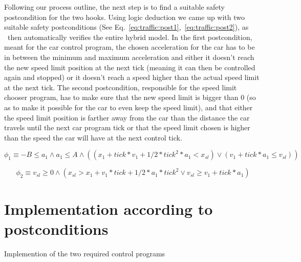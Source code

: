 Following our process outline, the next step is to find a suitable safety postcondition for the two hooks. Using logic deduction we came up with two suitable safety postconditions (See Eq.~\ref{eq:traffic:post1},~\ref{eq:traffic:post2}), as \keym~then automatically verifies the entire hybrid model. In the first postcondition, meant for the car control program, the chosen acceleration for the car has to be in between the minimum and maximum acceleration and either it doesn't reach the new speed limit position at the next tick (meaning it can then be controlled again and stopped) or it doesn't reach a speed higher than the actual speed limit at the next tick. The second postcondition, responsible for the speed limit chooser program, has to make sure that the new speed limit is bigger than 0 (so as to make it possible for the car to even keep the speed limit), and that either the speed limit position is farther away from the car than the distance the car travels until the next car program tick or that the speed limit chosen is higher than the speed the car will have at the next control tick.

\begin{equation}
	\phi_1 \equiv- B \leq a_1 \wedge a_1 \leq A \wedge ((x_1+tick*v_1 + 1/2*tick^2*a_1 < x_{sl}) \vee (v_1 + tick * a_1 \leq v_{sl}))
	\label{eq:traffic:post1}
\end{equation}
	
	
\begin{equation}
	\phi_2\equiv v_{sl} \geq 0 \wedge (x_{sl} > x_1 + v_1*tick+1/2*a_1*tick^2 \vee v_{sl} \geq v_1 + tick * a_1)
\end{equation}

\section{Implementation according to postconditions}
\label{sec:traffic:impl}

Implemention of the two required control programs
	